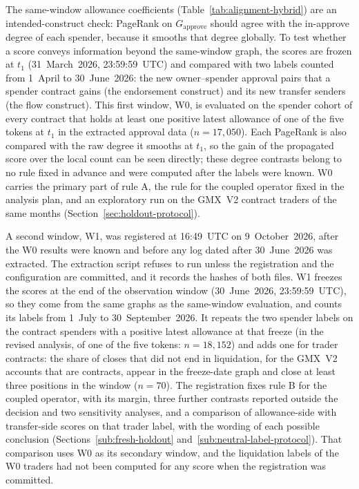 The same-window allowance coefficients (Table~\ref{tab:alignment-hybrid}) are an intended-construct check: PageRank on $G_{\text{approve}}$ should agree with the in-approve degree of each spender, because it smooths that degree globally. To test whether a score conveys information beyond the same-window graph, the scores are frozen at $t_1$ (31~March~2026, 23:59:59~UTC) and compared with two labels counted from 1~April to 30~June~2026: the new owner--spender approval pairs that a spender contract gains (the endorsement construct) and its new transfer senders (the flow construct). This first window, W0, is evaluated on the spender cohort of every contract that holds at least one positive latest allowance of one of the five tokens at $t_1$ in the extracted approval data ($n=17{,}050$). Each PageRank is also compared with the raw degree it smooths at $t_1$, so the gain of the propagated score over the local count can be seen directly; these degree contrasts belong to no rule fixed in advance and were computed after the labels were known. W0 carries the primary part of rule A, the rule for the coupled operator fixed in the analysis plan, and an exploratory run on the GMX~V2 contract traders of the same months (Section~\ref{sec:holdout-protocol}).

A second window, W1, was registered at 16:49~UTC on 9~October~2026, after the W0 results were known and before any log dated after 30~June~2026 was extracted. The extraction script refuses to run unless the registration and the configuration are committed, and it records the hashes of both files. W1 freezes the scores at the end of the observation window (30~June~2026, 23:59:59~UTC), so they come from the same graphs as the same-window evaluation, and counts its labels from 1~July to 30~September~2026. It repeats the two spender labels on the contract spenders with a positive latest allowance at that freeze (in the revised analysis, of one of the five tokens: $n=18{,}152$) and adds one for trader contracts: the share of closes that did not end in liquidation, for the GMX~V2 accounts that are contracts, appear in the freeze-date graph and close at least three positions in the window ($n=70$). The registration fixes rule B for the coupled operator, with its margin, three further contrasts reported outside the decision and two sensitivity analyses, and a comparison of allowance-side with transfer-side scores on that trader label, with the wording of each possible conclusion (Sections~\ref{sub:fresh-holdout} and~\ref{sub:neutral-label-protocol}). That comparison uses W0 as its secondary window, and the liquidation labels of the W0 traders had not been computed for any score when the registration was committed.


